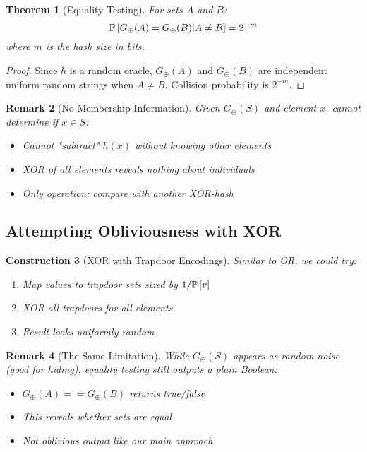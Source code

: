 \documentclass[11pt,final,hidelinks]{article}
\newcommand{\XOR}{\oplus}
\newtheorem{theorem}{Theorem}[section]
\newtheorem{remark}[theorem]{Remark}
\newtheorem{construction}[theorem]{Construction}
\begin{document}
\begin{theorem}[Equality Testing]
For sets $A$ and $B$:
\begin{equation}
\Prob{G_{\XOR}(A) = G_{\XOR}(B) | A \neq B} = 2^{-m}
\end{equation}
where $m$ is the hash size in bits.
\end{theorem}

\begin{proof}
Since $h$ is a random oracle, $G_{\XOR}(A)$ and $G_{\XOR}(B)$ are independent uniform random strings when $A \neq B$. Collision probability is $2^{-m}$.
\end{proof}

\begin{remark}[No Membership Information]
Given $G_{\XOR}(S)$ and element $x$, cannot determine if $x \in S$:
\begin{itemize}
    \item Cannot "subtract" $h(x)$ without knowing other elements
    \item XOR of all elements reveals nothing about individuals
    \item Only operation: compare with another XOR-hash
\end{itemize}
\end{remark}

\subsection{Attempting Obliviousness with XOR}

\begin{construction}[XOR with Trapdoor Encodings]
Similar to OR, we could try:
\begin{enumerate}
    \item Map values to trapdoor sets sized by $1/\mathbb{P}\left[v\right]$
    \item XOR all trapdoors for all elements
    \item Result looks uniformly random
\end{enumerate}
\end{construction}

\begin{remark}[The Same Limitation]
While $G_{\XOR}(S)$ appears as random noise (good for hiding), equality testing still outputs a plain Boolean:
\begin{itemize}
    \item $G_{\XOR}(A) == G_{\XOR}(B)$ returns true/false
    \item This reveals whether sets are equal
    \item Not oblivious output like our main approach
\end{itemize}
\end{remark}
\end{document}
